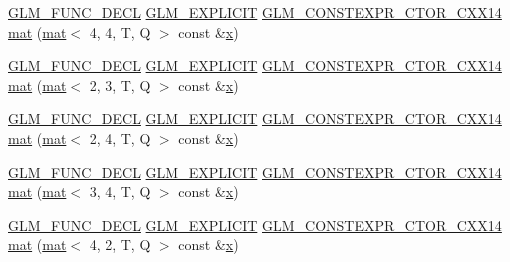 \begin{DoxyCompactItemize}
\item 
\hyperlink{setup_8hpp_ab2d052de21a70539923e9bcbf6e83a51}{G\+L\+M\+\_\+\+F\+U\+N\+C\+\_\+\+D\+E\+CL} \hyperlink{setup_8hpp_a6c74f5a5e7b134ab69023ff9a30d4d5d}{G\+L\+M\+\_\+\+E\+X\+P\+L\+I\+C\+IT} \hyperlink{setup_8hpp_a0900f9145e68bf6061b6f5e7be3fa751}{G\+L\+M\+\_\+\+C\+O\+N\+S\+T\+E\+X\+P\+R\+\_\+\+C\+T\+O\+R\+\_\+\+C\+X\+X14} \hyperlink{structglm_1_1mat_3_013_00_012_00_01_t_00_01_q_01_4_a04c3a51eacd2ae7b1dd760e477e61693}{mat} (\hyperlink{structglm_1_1mat}{mat}$<$ 4, 4, T, Q $>$ const \&\hyperlink{_s_d_l__opengl_8h_ad0e63d0edcdbd3d79554076bf309fd47}{x})
\item 
\hyperlink{setup_8hpp_ab2d052de21a70539923e9bcbf6e83a51}{G\+L\+M\+\_\+\+F\+U\+N\+C\+\_\+\+D\+E\+CL} \hyperlink{setup_8hpp_a6c74f5a5e7b134ab69023ff9a30d4d5d}{G\+L\+M\+\_\+\+E\+X\+P\+L\+I\+C\+IT} \hyperlink{setup_8hpp_a0900f9145e68bf6061b6f5e7be3fa751}{G\+L\+M\+\_\+\+C\+O\+N\+S\+T\+E\+X\+P\+R\+\_\+\+C\+T\+O\+R\+\_\+\+C\+X\+X14} \hyperlink{structglm_1_1mat_3_013_00_012_00_01_t_00_01_q_01_4_a4b02f7ad11d2cae0c7b96eeb13f72a2f}{mat} (\hyperlink{structglm_1_1mat}{mat}$<$ 2, 3, T, Q $>$ const \&\hyperlink{_s_d_l__opengl_8h_ad0e63d0edcdbd3d79554076bf309fd47}{x})
\item 
\hyperlink{setup_8hpp_ab2d052de21a70539923e9bcbf6e83a51}{G\+L\+M\+\_\+\+F\+U\+N\+C\+\_\+\+D\+E\+CL} \hyperlink{setup_8hpp_a6c74f5a5e7b134ab69023ff9a30d4d5d}{G\+L\+M\+\_\+\+E\+X\+P\+L\+I\+C\+IT} \hyperlink{setup_8hpp_a0900f9145e68bf6061b6f5e7be3fa751}{G\+L\+M\+\_\+\+C\+O\+N\+S\+T\+E\+X\+P\+R\+\_\+\+C\+T\+O\+R\+\_\+\+C\+X\+X14} \hyperlink{structglm_1_1mat_3_013_00_012_00_01_t_00_01_q_01_4_ad621570fabd8b456cb7a8b8e93092cc5}{mat} (\hyperlink{structglm_1_1mat}{mat}$<$ 2, 4, T, Q $>$ const \&\hyperlink{_s_d_l__opengl_8h_ad0e63d0edcdbd3d79554076bf309fd47}{x})
\item 
\hyperlink{setup_8hpp_ab2d052de21a70539923e9bcbf6e83a51}{G\+L\+M\+\_\+\+F\+U\+N\+C\+\_\+\+D\+E\+CL} \hyperlink{setup_8hpp_a6c74f5a5e7b134ab69023ff9a30d4d5d}{G\+L\+M\+\_\+\+E\+X\+P\+L\+I\+C\+IT} \hyperlink{setup_8hpp_a0900f9145e68bf6061b6f5e7be3fa751}{G\+L\+M\+\_\+\+C\+O\+N\+S\+T\+E\+X\+P\+R\+\_\+\+C\+T\+O\+R\+\_\+\+C\+X\+X14} \hyperlink{structglm_1_1mat_3_013_00_012_00_01_t_00_01_q_01_4_a687a9e4d03ba48c9b1265fe02c20678f}{mat} (\hyperlink{structglm_1_1mat}{mat}$<$ 3, 4, T, Q $>$ const \&\hyperlink{_s_d_l__opengl_8h_ad0e63d0edcdbd3d79554076bf309fd47}{x})
\item 
\hyperlink{setup_8hpp_ab2d052de21a70539923e9bcbf6e83a51}{G\+L\+M\+\_\+\+F\+U\+N\+C\+\_\+\+D\+E\+CL} \hyperlink{setup_8hpp_a6c74f5a5e7b134ab69023ff9a30d4d5d}{G\+L\+M\+\_\+\+E\+X\+P\+L\+I\+C\+IT} \hyperlink{setup_8hpp_a0900f9145e68bf6061b6f5e7be3fa751}{G\+L\+M\+\_\+\+C\+O\+N\+S\+T\+E\+X\+P\+R\+\_\+\+C\+T\+O\+R\+\_\+\+C\+X\+X14} \hyperlink{structglm_1_1mat_3_013_00_012_00_01_t_00_01_q_01_4_aa627625de3446c7169e7b338fbbcec8c}{mat} (\hyperlink{structglm_1_1mat}{mat}$<$ 4, 2, T, Q $>$ const \&\hyperlink{_s_d_l__opengl_8h_ad0e63d0edcdbd3d79554076bf309fd47}{x})

\end{DoxyCompactItemize}

